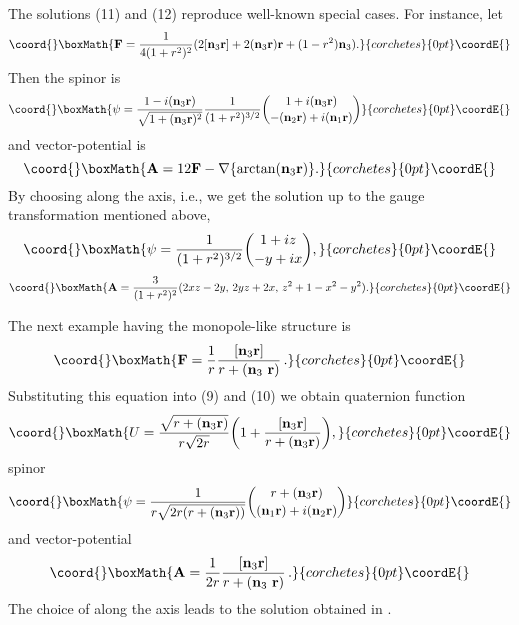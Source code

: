 \documentclass[12pt,a4paper]{article}
\begin{document}
The solutions  (11) and (12) reproduce well-known
special cases. For instance, let
\begin{displaymath}\coord{}\boxMath{
\mathbf{F}=\frac{1}{4(1+r^2)^2}(2[\mathbf{n}_3\mathbf{r}]+
2(\mathbf{n}_3\mathbf{r})\mathbf{r}+(1-r^2)\mathbf{n}_3).
}{corchetes}{0pt}\coordE{}\end{displaymath}
Then the spinor is
\begin{displaymath}\coord{}\boxMath{
\psi=\frac{1-i(\mathbf{n}_3\mathbf{r})}{\sqrt{1+(\mathbf{n}_3\mathbf{r})^2}}
\frac{1}{(1+r^2)^{3/2}}{1+i(\mathbf{n}_3\mathbf{r})
\choose -(\mathbf{n}_2\mathbf{r})+i(\mathbf{n}_1\mathbf{r})}
}{corchetes}{0pt}\coordE{}\end{displaymath}
and vector-potential is
\begin{displaymath}\coord{}\boxMath{
\mathbf{A}=12\mathbf{F}-\mathbf{\nabla}\{\arctan(\mathbf{n}_3\mathbf{r})\}.
}{corchetes}{0pt}\coordE{}\end{displaymath}
By choosing \coordHE{} along the \coordHE{} axis, i.e., \coordHE{} we get
the solution \cite{Nash} up to the gauge transformation mentioned above,
\begin{displaymath}\coord{}\boxMath{
\psi=\frac{1}{(1+r^2)^{3/2}}{1+iz \choose -y+ix},
}{corchetes}{0pt}\coordE{}\end{displaymath}
\begin{displaymath}\coord{}\boxMath{
\mathbf{A}=\frac{3}{(1+r^2)^2}(2xz-2y,\, 2yz+2x,\,
z^2+1-x^2-y^2).
}{corchetes}{0pt}\coordE{}\end{displaymath}

The next example having the monopole-like structure is
\begin{displaymath}\coord{}\boxMath{
\mathbf{F}=\frac{1}{r}
\frac{[\mathbf{n}_3\mathbf{r}]}{r+(\mathbf{n}_3\
\mathbf{r})}\, .
}{corchetes}{0pt}\coordE{}\end{displaymath}
Substituting this equation into (9) and (10) we obtain quaternion function
\begin{displaymath}\coord{}\boxMath{
U=\frac{\sqrt{r+(\mathbf{n}_3\mathbf{r})}}{r\sqrt{2r}}\biggl(1+
\frac{[\mathbf{n}_3\mathbf{r}]}{r+(\mathbf{n}_3\mathbf{r})}
\biggr),
}{corchetes}{0pt}\coordE{}\end{displaymath}
spinor
\begin{displaymath}\coord{}\boxMath{
\psi=\frac{1}{r\sqrt{2r(r+(\mathbf{n}_3\mathbf{r}))}}
{r+(\mathbf{n}_3\mathbf{r}) \choose (\mathbf{n}_1\mathbf{r})+i(\mathbf{n}_2\mathbf{r})}
}{corchetes}{0pt}\coordE{}\end{displaymath}
and vector-potential
\begin{displaymath}\coord{}\boxMath{
\mathbf{A}=\frac{1}{2r}
\frac{[\mathbf{n}_3\mathbf{r}]}{r+(\mathbf{n}_3\
\mathbf{r})}\, .
}{corchetes}{0pt}\coordE{}\end{displaymath}
The choice of \coordHE{} along the \coordHE{} axis  leads to the solution obtained in \cite{Freund}.
\end{document}
